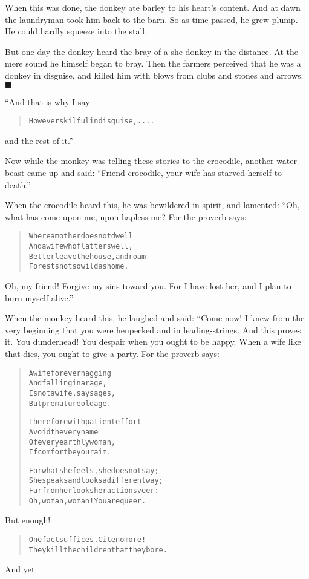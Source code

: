 \documentclass[article, twoside, 14pt]{memoir}
\newcommand{\qed}{\hfill \ensuremath{\blacksquare}}
\renewenvironment{verbatim}{%
\begin{quote}%
\vskip -10pt%
\begin{alltt}\normalfont\large}{\end{alltt}%
\end{quote}%
\vskip -10pt
} %
\begin{document}
When this was done, the donkey ate barley to his heart's content.
And at dawn the laundryman took him back to the barn. So as time
passed, he grew plump. He could hardly squeeze into the
stall.

But one day the donkey heard the bray of a she-donkey in the
distance. At the mere sound he himself began to bray. Then the
farmers perceived that he was a donkey in disguise, and killed him
with blows from clubs and stones and arrows.\hyperref[s73]{\qed}

“And that is why I say:

\begin{verbatim}
However skilful in disguise, ....
\end{verbatim}
and the rest of it.”

Now while the monkey was telling these stories to the crocodile,
another water-beast came up and said:
``Friend crocodile, your wife has starved herself to death.''

When the crocodile heard this, he was bewildered in spirit, and
lamented: “Oh, what has come upon me, upon hapless me? For the
proverb says:

\begin{verbatim}
Where a mother does not dwell
And a wife who flatters well,
Better leave the house, and roam
Forests not so wild as home.
\end{verbatim}
Oh, my friend! Forgive my sins toward you. For I have lost her, and
I plan to burn myself alive.”

When the monkey heard this, he laughed and said: “Come now! I knew
from the very beginning that you were henpecked and in
leading-strings. And this proves it. You dunderhead! You despair
when you ought to be happy. When a wife like that dies, you ought
to give a party. For the proverb says:

\begin{verbatim}
A wife forever nagging
    And falling in a rage,
Is not a wife, say sages,
    But premature old age.

Therefore with patient effort
    Avoid the very name
Of every earthly woman,
    If comfort be your aim.

For what she feels, she does not say;
She speaks and looks a different way;
Far from her looks her actions veer:
Oh, woman, woman! You are queer.
\end{verbatim}
But enough!

\begin{verbatim}
One fact suffices. Cite no more!
They kill the children that they bore.
\end{verbatim}
And yet:
\end{document}
